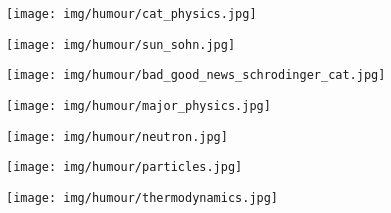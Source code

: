 	\begin{center}\underline{\hspace{5 cm}}\end{center}
	
	\begin{center}
	\texttt{[image: img/humour/cat\_physics.jpg]}
	\end{center}
	
	\begin{center}\underline{\hspace{5 cm}}\end{center}
	
	\begin{center}
	\texttt{[image: img/humour/sun\_sohn.jpg]}
	\end{center}
	
	\begin{center}\underline{\hspace{5 cm}}\end{center}
	
	\begin{center}
	\texttt{[image: img/humour/bad\_good\_news\_schrodinger\_cat.jpg]}
	\end{center}

	\begin{center}\underline{\hspace{5 cm}}\end{center}

	\begin{center}
	\texttt{[image: img/humour/major\_physics.jpg]}
	\end{center}
	
	\begin{center}\underline{\hspace{5 cm}}\end{center}

	\begin{center}
	\texttt{[image: img/humour/neutron.jpg]}
	\end{center}
	
	\begin{center}\underline{\hspace{5 cm}}\end{center}

	\begin{center}
	\texttt{[image: img/humour/particles.jpg]}
	\end{center}
	
	\begin{center}
	\texttt{[image: img/humour/thermodynamics.jpg]}
	\end{center}
	
